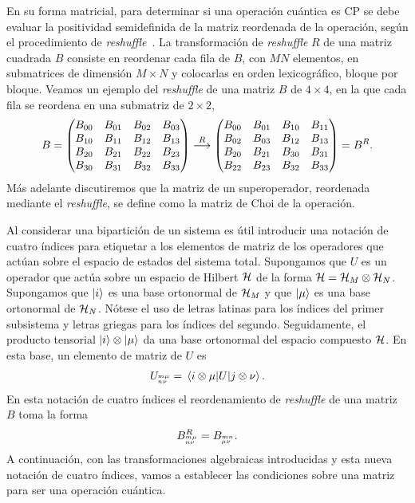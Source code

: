 En su forma matricial, para determinar si una operación cuántica es CP
se debe evaluar la positividad semidefinida de la matriz reordenada 
de la operación, según el procedimiento de
\textit{reshuffle}~\cite{bengtsson_zyczkowski_2017}.
La transformación de \textit{reshuffle} $R$ de una matriz cuadrada $B$ 
consiste en reordenar cada fila de $B$, con $MN$ elementos, 
en submatrices de dimensión $M\times N$ y colocarlas en 
orden lexicográfico, bloque por bloque. Veamos un ejemplo del 
\textit{reshuffle} de una matriz $B$ de $4\times 4$, en la que 
cada fila se reordena en una submatriz de $2\times 2$,
\begin{align}
B=
\mqty(
B_{00}&B_{01}&B_{02}&B_{03}\\
B_{10}&B_{11}&B_{12}&B_{13}\\
B_{20}&B_{21}&B_{22}&B_{23}\\
B_{30}&B_{31}&B_{32}&B_{33})
\stackrel{R}{\longrightarrow}
\mqty(
B_{00}&B_{01}&B_{10}&B_{11}\\
B_{02}&B_{03}&B_{12}&B_{13}\\
B_{20}&B_{21}&B_{30}&B_{31}\\
B_{22}&B_{23}&B_{32}&B_{33})
=B^R.
\label{eq:reshuffle}
\end{align}
Más adelante discutiremos que la matriz de un superoperador, 
reordenada mediante el \textit{reshuffle}, se define como la matriz de Choi
de la operación.

Al considerar una bipartición de un sistema es útil introducir una notación
de cuatro índices para etiquetar a los elementos de matriz de los operadores
que actúan sobre el espacio de estados del sistema total. 
Supongamos que $U$ es un operador que actúa sobre un espacio de Hilbert 
$\mathcal{H}$ de la forma $\mathcal{H}=\mathcal{H}_M\otimes\mathcal{H}_N$.
Supongamos que $\ket{i}$ es una base ortonormal de $\mathcal{H}_M$ 
y que $\ket{\mu}$ es una base ortonormal de $\mathcal{H}_N$. 
Nótese el uso de letras latinas para los índices del
primer subsistema y letras griegas para los índices del segundo.
Seguidamente, el producto tensorial $\ket{i}\otimes\ket{\mu}$
da una base ortonormal del espacio compuesto $\mathcal{H}$. 
En esta base, un elemento de matriz de $U$ es
\begin{align}
U_\ind{m\mu}{n\nu}=\matrixel{i\otimes \mu}{U}{j\otimes \nu}.
\label{eq:4indices}
\end{align}
En esta notación de cuatro índices el reordenamiento 
de \textit{reshuffle} de una matriz  $B$ toma la 
forma~\cite{bengtsson_zyczkowski_2017}
\begin{align}
B^R_{{}^{m\mu}_{n\nu}} = B_{{}^{mn}_{\mu\nu}}.
\label{eq:R-4ind}
\end{align}
A continuación, con las transformaciones algebraicas introducidas y
esta nueva notación de cuatro índices,
vamos a establecer las condiciones sobre una matriz para ser una 
operación cuántica. 

